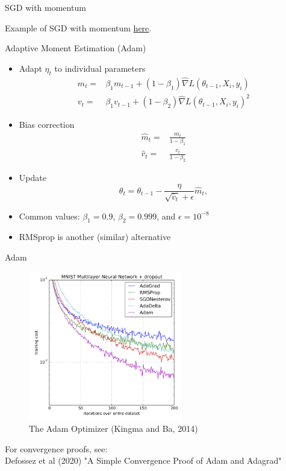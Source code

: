\documentclass[10pt]{beamer}
\begin{document}
\begin{frame}{SGD with momentum}

Example of SGD with momentum \href{https://distill.pub/2017/momentum/}{here}.

\end{frame}


\begin{frame}{Adaptive Moment Estimation (Adam)}

\begin{itemize}
\item Adapt $\eta_t$ to individual parameters
\begin{align*}
m_t =& \beta_1 m_{t-1} + (1-\beta_1) \hat{\nabla} L(\theta_{t-1}, X_{i}, y_{i}) \\
v_t =& \beta_1 v_{t-1} + (1-\beta_2) \hat{\nabla} L(\theta_{t-1}, X_{i}, y_{i})^2
\end{align*}
\item Bias correction
\begin{align*}
\hat{m}_t =& \frac {m_{t}}{1-\beta_1}\\
\hat{v}_t =& \frac {v_{t}}{1-\beta_2}
\end{align*}
\item Update
\[
\theta_t = \theta_{t-1} - \frac{\eta}{\sqrt{\hat{v}_t} + \epsilon} \hat{m}_t,
\]
\item Common values: $\beta_1=0.9$, $\beta_2=0.999$, and $\epsilon=10^{-8}$
\item RMSprop is another (similar) alternative
\end{itemize}

\end{frame}

\begin{frame}{Adam}

\begin{figure}[h]
\caption{The Adam Optimizer (Kingma and Ba, 2014)}
\centering
\includegraphics[width=0.6\textwidth]{figs/ADAM}
\end{figure}

For convergence proofs, see:\\
Defossez et al (2020) "A Simple Convergence Proof of Adam and Adagrad"

\end{frame}
\end{document}

